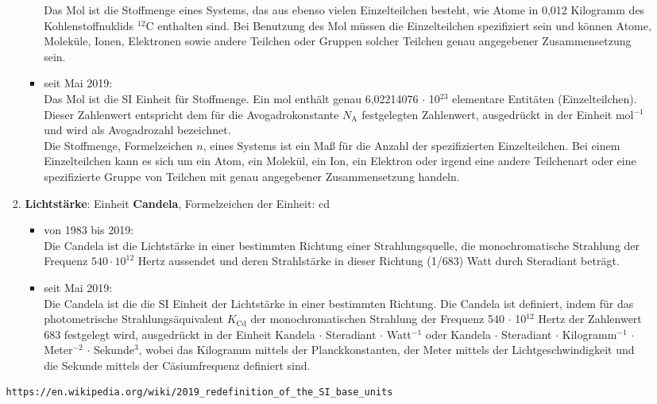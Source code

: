 \begin{raggedright}
\begin{enumerate}
\begin{itemize}
\begin{enumerate}[1.)]
\begin{itemize}
			Das Mol ist die Stoffmenge eines Systems, das aus ebenso vielen
			Einzelteilchen besteht, wie Atome in 0,012 Kilogramm des
			Kohlenstoffnuklids $^{12}\mathrm{C}$ enthalten sind. Bei Benutzung des Mol
			müssen die Einzelteilchen spezifiziert sein und können Atome, Moleküle,
			Ionen, Elektronen sowie andere Teilchen oder Gruppen solcher
			Teilchen genau angegebener Zusammensetzung sein.
			\item seit Mai 2019:\\
      Das Mol ist die SI Einheit für Stoffmenge. Ein mol
      enthält genau 6,02214076 $\cdot$ 10$^{23}$ elementare Entitäten (Einzelteilchen).
      Dieser Zahlenwert entspricht dem für die Avogadrokonstante
      $N_\mathrm{A}$ festgelegten Zahlenwert, ausgedrückt in der Einheit mol$^{-1}$
      und wird als Avogadrozahl bezeichnet.\\
      Die Stoffmenge, Formelzeichen $n$, eines Systems ist ein Maß für die Anzahl der
      spezifizierten Einzelteilchen. Bei einem Einzelteilchen kann es sich um ein Atom, ein Molekül,
      ein Ion, ein Elektron oder irgend eine andere Teilchenart oder eine spezifizierte Gruppe
      von Teilchen mit genau angegebener Zusammensetzung handeln.\\
			\end{itemize}
		\item \textbf{Lichtstärke}: Einheit \textbf{Candela}, Formelzeichen der Einheit: cd
			\begin{itemize}
			\item von 1983 bis 2019:\\
			Die Candela ist die Lichtstärke in einer bestimmten Richtung
			einer Strahlungsquelle, die monochromatische Strahlung der
			Frequenz $540 \cdot 10^{12}$ Hertz aussendet und deren Strahlstärke in
			dieser Richtung (1/683) Watt durch Steradiant beträgt.
			\item seit Mai 2019:\\
      Die Candela ist die die SI Einheit der Lichtstärke in einer bestimmten Richtung.
      Die Candela ist definiert, indem für das photometrische Strahlungsäquivalent
      $K_\mathrm{Cd}$ der monochromatischen Strahlung der
      Frequenz 540 $\cdot$ 10$^{12}$ Hertz der Zahlenwert 683 festgelegt wird,
      ausgedrückt in der Einheit Kandela $\cdot$ Steradiant $\cdot$ Watt$^{-1}$
      oder Kandela $\cdot$ Steradiant $\cdot$ Kilogramm$^{-1}$ $\cdot$ Meter$^{-2}$ $\cdot$ Sekunde$^3$,
      wobei das Kilogramm mittels der Planckkonstanten, der Meter mittels
      der Lichtgeschwindigkeit und die Sekunde mittels der Cäsiumfrequenz definiert sind.
			\end{itemize}
		\end{enumerate}
	\begin{verbatim}
https://en.wikipedia.org/wiki/2019_redefinition_of_the_SI_base_units


\end{verbatim}
\end{itemize}
\end{enumerate}
\end{raggedright}
